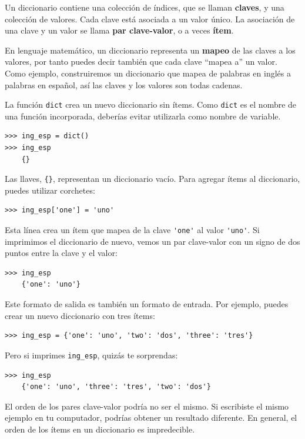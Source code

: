 \documentclass[10pt]{book}
\begin{document}
Un diccionario contiene una colección de índices, que se llaman {\bf
  claves}, y una colección de valores.  Cada clave está asociada a un
valor único.  La asociación de una clave y un valor se llama {\bf
  par clave-valor}, o a veces {\bf ítem}.  

En lenguaje matemático, un diccionario representa un {\bf mapeo}
de las claves a los valores, por tanto puedes decir también que cada clave
``mapea a'' un valor.
Como ejemplo, construiremos un diccionario que mapea de palabras en inglés
a palabras en español, así las claves y los valores son todas cadenas.

La función {\tt dict} crea un nuevo diccionario sin ítems.
Como {\tt dict} es el nombre de una función incorporada,
deberías evitar utilizarla como nombre de variable.

\begin{verbatim}
>>> ing_esp = dict()
>>> ing_esp
    {}
\end{verbatim}

Las llaves, \verb"{}", representan un diccionario vacío.
Para agregar ítems al diccionario, puedes utilizar corchetes:

\begin{verbatim}
>>> ing_esp['one'] = 'uno'
\end{verbatim}
%
Esta línea crea un ítem que mapea de la clave
\verb"'one'" al valor \verb"'uno'".  Si imprimimos el
diccionario de nuevo, vemos un par clave-valor con un signo de dos puntos
entre la clave y el valor:

\begin{verbatim}
>>> ing_esp
    {'one': 'uno'}
\end{verbatim}
%
Este formato de salida es también un formato de entrada.  Por ejemplo,
puedes crear un nuevo diccionario con tres ítems:

\begin{verbatim}
>>> ing_esp = {'one': 'uno', 'two': 'dos', 'three': 'tres'}
\end{verbatim}
%
Pero si imprimes {\tt ing\_esp}, quizás te sorprendas:

\begin{verbatim}
>>> ing_esp
    {'one': 'uno', 'three': 'tres', 'two': 'dos'}
\end{verbatim}
%
El orden de los pares clave-valor podría no ser el mismo.  Si
escribiste el mismo ejemplo en tu computador, podrías obtener un
resultado diferente.  En general, el orden de los ítems en
un diccionario es impredecible.
\end{document}
